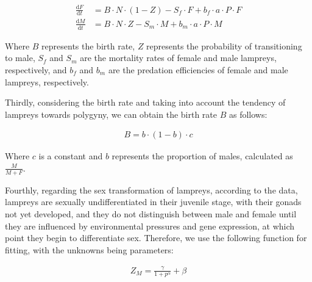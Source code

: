 \documentclass[CTeX = true]{mcmthesis}  %
\begin{document}
\begin{equation}
\label{eq:MF}
\begin{aligned}
\frac{\mathrm{d} F}{\mathrm{d} t} &= B\cdot N\cdot (1-Z)-S_{f}\cdot F+b_{f}\cdot a \cdot P \cdot F \\
\frac{\mathrm{d} M}{\mathrm{d} t} &= B\cdot N\cdot Z-S_{m}\cdot M+b_{m}\cdot a \cdot P \cdot M
\end{aligned}
\end{equation}

Where $B$ represents the birth rate, $Z$ represents the probability of transitioning to male, $S_{f}$ and $S_{m}$ are the mortality rates of female and male lampreys, respectively, and $b_{f}$ and $b_{m}$ are the predation efficiencies of female and male lampreys, respectively.

Thirdly, considering the birth rate and taking into account the tendency of lampreys towards polygyny, we can obtain the birth rate \( B \) as follows:

\begin{equation}
\begin{aligned}
B=b\cdot (1-b)\cdot c
\end{aligned}
\end{equation}

Where $c$ is a constant and $b$ represents the proportion of males, calculated as $\frac{M}{M+F}$.

Fourthly, regarding the sex transformation of lampreys, according to the data, lampreys are sexually undifferentiated in their juvenile stage, with their gonads not yet developed, and they do not distinguish between male and female until they are influenced by environmental pressures and gene expression, at which point they begin to differentiate sex. Therefore, we use the following function for fitting, with the unknowns being parameters:

\begin{equation}
\begin{aligned}
Z_{M}=\frac{\gamma }{1+p^{\alpha } } +\beta 
\end{aligned}
\end{equation}
\end{document}
